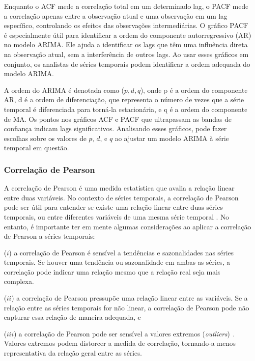  Enquanto o ACF mede a correlação total em um determinado lag, o PACF mede a correlação apenas entre a observação atual e uma observação em um lag específico, controlando os efeitos das observações intermediárias. O gráfico PACF é especialmente útil para identificar a ordem do componente autorregressivo (AR) no modelo ARIMA. Ele ajuda a identificar os lags que têm uma influência direta na observação atual, sem a interferência de outros lags. Ao usar esses gráficos em conjunto, os analistas de séries temporais podem identificar a ordem adequada do modelo ARIMA. 
 
 A ordem do ARIMA é denotada como ($p, d, q$), onde p é a ordem do componente AR, d é a ordem de diferenciação, que representa o número de vezes que a série temporal é diferenciada para torná-la estacionária, e q é a ordem do componente de MA. Os pontos nos gráficos ACF e PACF que ultrapassam as bandas de confiança indicam lags significativos. Analisando esses gráficos, pode fazer escolhas sobre os valores de $p$, $d$, e $q$ ao ajustar um modelo ARIMA à série temporal em questão. 
 
 \subsubsection{Correla\c c\~ao de Pearson}
 
 A correlação de Pearson é uma medida estatística que avalia a relação linear entre duas variáveis. No contexto de séries temporais, a correlação de Pearson pode ser útil para entender se existe uma relação linear entre duas séries temporais, ou entre diferentes variáveis de uma mesma série temporal \cite{CESARDELIMANOGUEIRA2023128066}. No entanto, é importante ter em mente algumas considerações ao aplicar a correlação de Pearson a séries temporais: 
 
 ($i$) a correlação de Pearson é sensível a tendências e sazonalidades nas séries temporais. Se houver uma tendência ou sazonalidade em ambas as séries, a correlação pode indicar uma relação mesmo que a relação real seja mais complexa. 
 
 ($ii$) a correlação de Pearson pressupõe uma relação linear entre as variáveis. Se a relação entre as séries temporais for não linear, a correlação de Pearson pode não capturar essa relação de maneira adequada, e 
 
 ($iii$) a correlação de Pearson pode ser sensível a valores extremos (\textit{outliers}) \cite{DOSSANTOSCOELHO2024129366}. Valores extremos podem distorcer a medida de correlação, tornando-a menos representativa da relação geral entre as séries.
 
